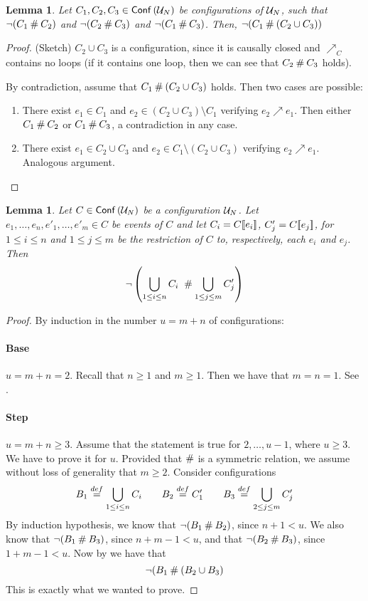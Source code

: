 \documentclass[12pt,a4paper]{article}
\newtheorem{lemma}[theorem]{Lemma}
\newcommand{\conf}[1]{\ensuremath{\mathop{\mathsf{Conf}}{(#1)}}}
\newcommand{\confl}{\ensuremath\mathbin\#}
\begin{document}
\begin{lemma}
\label{lem:c1c2c3}
Let $C_1, C_2, C_3 \in \conf{\unf N}$ be configurations of $\mathcal{U}_{N}$, such that
$\lnot (C_1 \confl C_2)$ and $\lnot (C_2 \confl C_3)$ and $\lnot (C_1 \confl
C_3)$.  Then, $\lnot (C_1 \confl (C_2 \cup C_3))$
\end{lemma}

\begin{proof}
(Sketch)  $C_2 \cup C_3$ is a configuration, since it is causally closed and
$\nearrow_C$ contains no loops (if it contains one loop, then we can see that
$C_2 \confl C_3$ holds).

By contradiction, assume that $C_1 \confl (C_2 \cup C_3)$ holds.  Then two
cases are possible:
\begin{enumerate}
\item There exist $e_1 \in C_1$ and $e_2 \in (C_2 \cup C_3) \setminus C_1$
verifying $e_2 \nearrow e_1$.  Then either $C_1 \confl C_2$ or $C_1 \confl
C_3$, a contradiction in any case.

\item There exist $e_1 \in C_2 \cup C_3$ and $e_2 \in C_1 \setminus (C_2 \cup
C_3)$ verifying $e_2 \nearrow e_1$.  Analogous argument.
\end{enumerate}
\end{proof}

\begin{lemma}
\label{lem:let.c2}
Let $C \in \conf{\unf N}$ be a configuration $\mathcal{U}_{N}$.  Let $e_1, \ldots, e_n,
e'_1, \ldots, e'_m \in C$ be events of $C$ and let $C_i = C [\![ e_i]\!]$, $C'_j =
C [\![ e_j]\!]$, for $1 \le i \le n$ and $1 \le j \le m$ be the restriction of $C$
to, respectively, each $e_i$ and $e_j$.  Then $$\lnot \left ( \bigcup_{1
\le i \le n} C_i \ \confl \bigcup_{1 \le j \le m} C'_j \right )$$
\end{lemma}

\begin{proof}
By induction in the number $u = m + n$ of configurations:

\paragraph{Base} $u = m + n = 2$.  Recall that $n \ge 1$ and $m \ge 1$.  Then
we have that $m = n = 1$.  See .

\paragraph{Step} $u = m + n \ge 3$. Assume that the statement is true for $2,
\ldots, u - 1$, where $u \ge 3$.  We have to prove it for $u$.  Provided that
$\confl$ is a symmetric relation, we assume without loss of generality that $m
\ge 2$.  Consider configurations $$B_1 \stackrel{def}{=} \bigcup_{1 \le i \le n} C_i
\qquad B_2 \stackrel{def}{=} C'_1 \qquad B_3 \stackrel{def}{=} \bigcup_{2 \le j \le m} C'_j$$ By
induction hypothesis, we know that $\lnot (B_1 \confl B_2)$, since $n + 1 < u$.
We also know that $\lnot (B_1 \confl B_3)$, since $n + m - 1 < u$, and that
$\lnot (B_2 \confl B_3)$, since $1 + m - 1 < u$.  Now by  we have
that $$\lnot (B_1 \confl (B_2 \cup B_3)$$  This is exactly what we wanted to
prove.
\end{proof}
\end{document}
